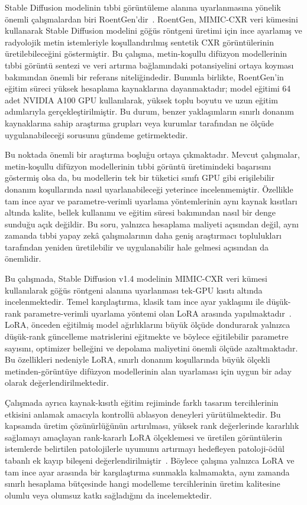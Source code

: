 \documentclass[11pt]{article}
\begin{document}
Stable Diffusion modelinin tıbbi görüntüleme alanına uyarlanmasına yönelik
önemli çalışmalardan biri RoentGen'dir~\cite{roentgen}. RoentGen, MIMIC-CXR
veri kümesini kullanarak Stable Diffusion modelini göğüs röntgeni üretimi için
ince ayarlamış ve radyolojik metin istemleriyle koşullandırılmış sentetik CXR
görüntülerinin üretilebileceğini göstermiştir. Bu çalışma, metin-koşullu
difüzyon modellerinin tıbbi görüntü sentezi ve veri artırma bağlamındaki
potansiyelini ortaya koyması bakımından önemli bir referans niteliğindedir.
Bununla birlikte, RoentGen'in eğitim süreci yüksek hesaplama kaynaklarına
dayanmaktadır; model eğitimi 64 adet NVIDIA A100 GPU kullanılarak, yüksek toplu
boyutu ve uzun eğitim adımlarıyla gerçekleştirilmiştir. Bu durum, benzer
yaklaşımların sınırlı donanım kaynaklarına sahip araştırma grupları veya
kurumlar tarafından ne ölçüde uygulanabileceği sorusunu gündeme getirmektedir.

Bu noktada önemli bir araştırma boşluğu ortaya çıkmaktadır. Mevcut çalışmalar,
metin-koşullu difüzyon modellerinin tıbbi görüntü üretimindeki başarısını
göstermiş olsa da, bu modellerin tek bir tüketici sınıfı GPU gibi erişilebilir
donanım koşullarında nasıl uyarlanabileceği yeterince incelenmemiştir. Özellikle
tam ince ayar ve parametre-verimli uyarlama yöntemlerinin aynı kaynak kısıtları
altında kalite, bellek kullanımı ve eğitim süresi bakımından nasıl bir denge
sunduğu açık değildir. Bu soru, yalnızca hesaplama maliyeti açısından değil,
aynı zamanda tıbbi yapay zekâ çalışmalarının daha geniş araştırmacı toplulukları
tarafından yeniden üretilebilir ve uygulanabilir hale gelmesi açısından da
önemlidir.

Bu çalışmada, Stable Diffusion v1.4 modelinin MIMIC-CXR veri kümesi kullanılarak
göğüs röntgeni alanına uyarlanması tek-GPU kısıtı altında incelenmektedir.
Temel karşılaştırma, klasik tam ince ayar yaklaşımı ile düşük-rank
parametre-verimli uyarlama yöntemi olan LoRA arasında yapılmaktadır~\cite{lora}.
LoRA, önceden eğitilmiş model ağırlıklarını büyük ölçüde dondurarak yalnızca
düşük-rank güncelleme matrislerini eğitmekte ve böylece eğitilebilir parametre
sayısını, optimizer belleğini ve depolama maliyetini önemli ölçüde
azaltmaktadır. Bu özellikleri nedeniyle LoRA, sınırlı donanım koşullarında
büyük ölçekli metinden-görüntüye difüzyon modellerinin alan uyarlaması için
uygun bir aday olarak değerlendirilmektedir.

Çalışmada ayrıca kaynak-kısıtlı eğitim rejiminde farklı tasarım tercihlerinin
etkisini anlamak amacıyla kontrollü ablasyon deneyleri yürütülmektedir. Bu
kapsamda üretim çözünürlüğünün artırılması, yüksek rank değerlerinde kararlılık
sağlamayı amaçlayan rank-kararlı LoRA ölçeklemesi ve üretilen görüntülerin
istemlerde belirtilen patolojilerle uyumunu artırmayı hedefleyen patoloji-ödül
tabanlı ek kayıp bileşeni değerlendirilmiştir~\cite{rslora,imagereward}. Böylece
çalışma yalnızca LoRA ve tam ince ayar arasında bir karşılaştırma sunmakla
kalmamakta, aynı zamanda sınırlı hesaplama bütçesinde hangi modelleme
tercihlerinin üretim kalitesine olumlu veya olumsuz katkı sağladığını da
incelemektedir.
\end{document}
